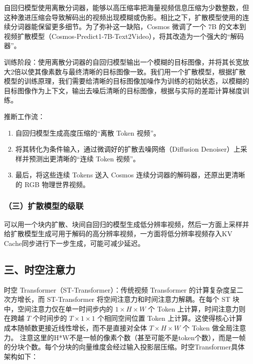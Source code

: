 自回归模型使用离散分词器，能够以高压缩率把海量视频信息压缩为少数整数，但这种激进压缩会导致解码出的视频出现模糊或伪影。相比之下，扩散模型使用的连续分词器能保留更多细节。为了弥补这一缺陷，Cosmos 微调了一个 7B 的文本到视频扩散模型（Cosmos-Predict1-7B-Text2Video），将其改造为一个强大的``解码器''。

训练阶段：使用离散分词器的自回归模型输出一个模糊的目标图像，并将其长宽放大2倍以使其像素数与最终清晰的目标图像一致。我们用一个扩散模型，根据扩散模型的训练原理，我们需要给清晰的目标图像加噪作为训练的初始状态，以模糊的目标图像作为上下文，输出去噪后清晰的目标图像，根据与实际的差距计算梯度训练。

推断工作流：

\begin{enumerate}
\def\labelenumi{\arabic{enumi}.}
\item
  自回归模型生成高度压缩的``离散 Token 视频''。
\item
  将其转化为条件输入，通过微调好的扩散去噪网络（Diffusion Denoiser）上采样并预测出更清晰的``连续 Token 视频''。
\item
  最后，将这些连续 Tokens 送入 Cosmos 连续分词器的解码器，还原出更清晰的 RGB 物理世界视频。
\end{enumerate}

\hypertarget{ux4e09ux6269ux6563ux6a21ux578bux7684ux7ea7ux8054}{%
\subsubsection{（三）扩散模型的级联}\label{ux4e09ux6269ux6563ux6a21ux578bux7684ux7ea7ux8054}}

可以用一个块内扩散、块间自回归的模型生成低分辨率视频，然后一方面上采样并给扩散模型生成可用于解码的高分辨率视频，一方面将低分辨率视频存入KV Cache同步进行下一步生成，可能可减少延迟。

\hypertarget{ux4e09ux65f6ux7a7aux6ce8ux610fux529b}{%
\subsection{三、时空注意力}\label{ux4e09ux65f6ux7a7aux6ce8ux610fux529b}}

时空 Transformer（ST-Transformer）：传统视频 Transformer 的计算复杂度呈二次方增长，而 ST-Transformer 将空间注意力和时间注意力解耦。在每个 ST 块中，空间注意力仅在单一时间步内的 \(1\times H\times W\) 个 Token 上计算，时间注意力则在跨越 \(T\) 个时间步的 \(T\times 1\times 1\) 个相同空间位置 Token 上计算。这使得核心计算成本随帧数更接近线性增长，而不是直接对全体 \(T\times H\times W\) 个 Token 做全局注意力。
注意这里的H*W不是一帧的像素个数（甚至可能不是token个数），而是一帧的分块个数。每个分块的向量维度会经过输入投影层压缩。时空Transformer具体架构如下：

